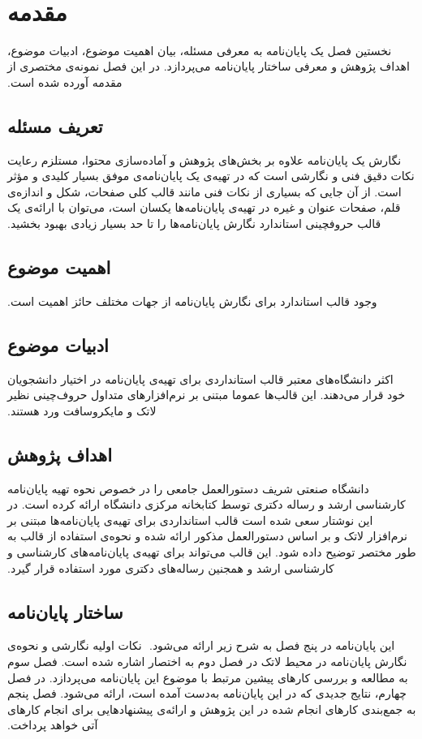 
‫\section{مقدمه}
‫
‫نخستین فصل یک پایان‌نامه به معرفی مسئله، بیان اهمیت موضوع، ادبیات موضوع،
‫اهداف پژوهش و معرفی ساختار پایان‌نامه می‌پردازد.
‫در این فصل نمونه‌ی مختصری از مقدمه آورده شده است.
‫
‫\subsection{تعریف مسئله}
‫
‫نگارش یک پایان‌نامه‌ علاوه بر بخش‌های پژوهش و آماده‌سازی محتوا،
‫مستلزم رعایت نکات دقیق فنی و نگارشی است 
‫که در تهیه‌ی یک پایان‌نامه‌ی موفق بسیار کلیدی و مؤثر است.
‫از آن جایی که بسیاری از نکات فنی مانند قالب کلی صفحات، شکل و اندازه‌ی قلم، 
‫صفحات عنوان و غیره در تهیه‌ی پایان‌نامه‌ها یکسان است،
‫می‌توان با ارائه‌ی یک قالب حروفچینی استاندارد 
‫نگارش پایان‌نامه‌ها را تا حد بسیار زیادی بهبود بخشید.
‫
‫\subsection{اهمیت موضوع}
‫
‫وجود قالب استاندارد برای نگارش پایان‌نامه از جهات مختلف حائز اهمیت است.
‫
‫\subsection{ادبیات موضوع}
‫
‫اکثر دانشگاه‌های معتبر قالب استانداردی برای تهیه‌ی پایان‌نامه در اختیار دانشجویان خود قرار می‌دهند.
‫این قالب‌ها عموما مبتنی بر نرم‌افزارهای متداول حروف‌چینی نظیر لاتک و مایکروسافت ورد هستند.
‫‫
‫
‫\subsection{اهداف پژوهش}
‫
‫دانشگاه صنعتی شریف دستورالعمل جامعی را در خصوص
‫نحوه تهیه پایان‌نامه کارشناسی ارشد و رساله دکتری توسط کتابخانه مرکزی دانشگاه ارائه کرده است.
‫در این نوشتار سعی شده است قالب استانداردی برای تهیه‌ی پایان‌نامه‌ها مبتنی بر نرم‌افزار لاتک و
‫بر اساس دستورالعمل مذکور ارائه شده و
‫نحوه‌ی استفاده از قالب به طور مختصر توضیح داده شود.
‫این قالب  می‌تواند برای تهیه‌ی پایان‌نامه‌های کارشناسی و کارشناسی ارشد 
‫و همجنین رساله‌ها‌ی دکتری مورد استفاده قرار گیرد.
‫
‫\subsection{ساختار پایان‌نامه}
‫
‫این پایان‌نامه در پنج فصل به شرح زیر ارائه می‌شود.
‫%
‫نکات اولیه نگارشی و نحوه‌ی نگارش پایان‌نامه در محیط لاتک در  فصل دوم به اختصار اشاره شده است. 
‫فصل سوم به مطالعه و بررسی کارهای پیشین مرتبط با موضوع این پایان‌نامه می‌پردازد.
‫در فصل چهارم، نتایج جدیدی که در این پایان‌نامه به‌دست آمده است، ارائه می‌شود.
‫فصل پنجم به جمع‌بندی کارهای انجام شده در این پژوهش و ارائه‌ی پیشنهادهایی برای انجام کارهای آتی خواهد پرداخت.